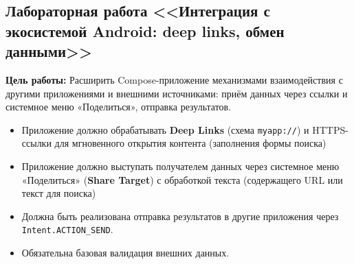 \subsection{Лабораторная работа <<Интеграция с экосистемой Android: deep links, обмен данными>>}

\textbf{Цель работы:} Расширить Compose-приложение механизмами взаимодействия с другими приложениями и внешними источниками: приём данных через ссылки и системное меню «Поделиться», отправка результатов.

\begin{itemize}
    \item Приложение должно обрабатывать \textbf{Deep Links} (схема \texttt{myapp://}) и HTTPS-ссылки для мгновенного открытия контента (заполнения формы поиска)
    \item Приложение должно выступать получателем данных через системное меню «Поделиться» (\textbf{Share Target}) с обработкой текста (содержащего URL или текст для поиска)
    \item Должна быть реализована отправка результатов в другие приложения через \texttt{Intent.ACTION\_SEND}.
    \item Обязательна базовая валидация внешних данных.
\end{itemize}
